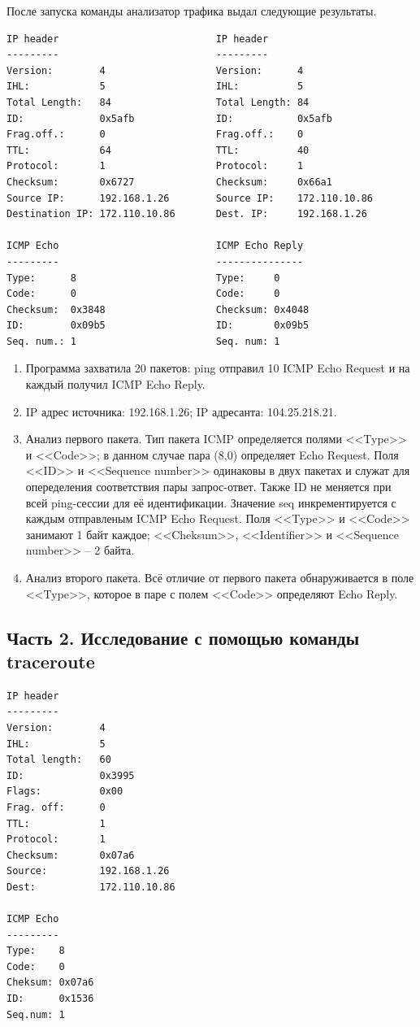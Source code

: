 \documentclass[12pt, a4paper] {ncc}
\begin{document}
    После запуска команды анализатор трафика выдал следующие результаты.
    \begin{verbatim}
IP header                           IP header
---------                           ---------
Version:        4                   Version:      4
IHL:            5                   IHL:          5
Total Length:   84                  Total Length: 84
ID:             0x5afb              ID:           0x5afb
Frag.off.:      0                   Frag.off.:    0
TTL:            64                  TTL:          40
Protocol:       1                   Protocol:     1
Checksum:       0x6727              Checksum:     0x66a1
Source IP:      192.168.1.26        Source IP:    172.110.10.86
Destination IP: 172.110.10.86       Dest. IP:     192.168.1.26

ICMP Echo                           ICMP Echo Reply
---------                           ---------------
Type:      8                        Type:     0
Code:      0                        Code:     0
Checksum:  0x3848                   Checksum: 0x4048
ID:        0x09b5                   ID:       0x09b5
Seq. num.: 1                        Seq. num: 1
    \end{verbatim}
    \begin{enumerate}
        \item Программа захватила 20 пакетов: ping  отправил 10 ICMP Echo Request и на каждый получил
              ICMP Echo Reply.
        \item IP адрес источника: 192.168.1.26; IP адресанта: 104.25.218.21.
        \item Анализ первого пакета. Тип пакета ICMP определяется полями <<Type>> и <<Code>>; в данном случае
              пара (8,0) определяет Echo Request. Поля <<ID>> и <<Sequence number>> одинаковы в двух пакетах и служат 
              для опеределения соответствия пары запрос-ответ. Также ID не меняется при всей ping-сессии для её
              идентификации. Значение seq инкрементируется с каждым отправленым ICMP Echo Request.
              Поля <<Type>> и <<Code>> занимают 1 байт каждое; <<Cheksum>>, <<Identifier>> и
              <<Sequence number>> -- 2 байта.
        \item Анализ второго пакета. Всё отличие от первого пакета обнаруживается в поле <<Type>>,
              которое в паре с полем <<Code>> определяют Echo Reply.
    \end{enumerate}

    \subsection*{Часть 2. Исследование с помощью команды traceroute}
\begin{verbatim}
IP header
---------
Version:        4
IHL:            5
Total length:   60
ID:             0x3995
Flags:          0x00
Frag. off:      0
TTL:            1
Protocol:       1
Checksum:       0x07a6
Source:         192.168.1.26
Dest:           172.110.10.86

ICMP Echo
---------
Type:    8
Code:    0
Cheksum: 0x07a6
ID:      0x1536
Seq.num: 1
\end{verbatim}
\end{document}
